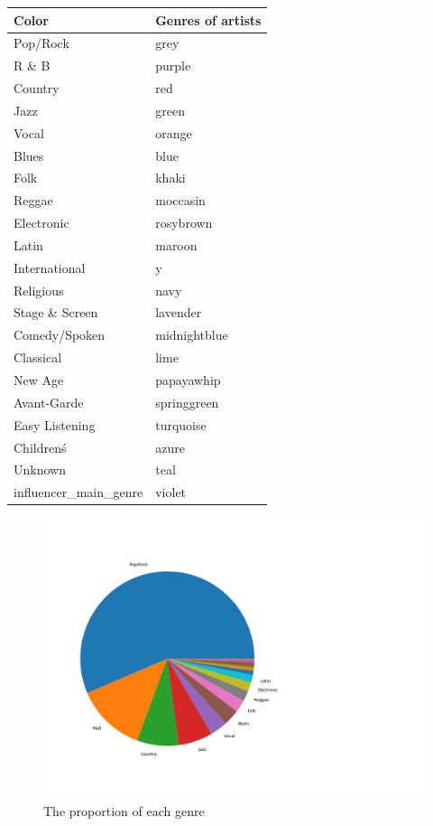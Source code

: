 \documentclass[12pt]{article}
\begin{document}
\begin{center}
\begin{tabular}{l|l}
Color & Genres of artists
\\ \hline
Pop/Rock  & grey       \\                     
R \& B  & purple\\
Country & red\\
Jazz & green\\
Vocal & orange\\
Blues & blue\\
Folk & khaki\\
Reggae & moccasin\\
Electronic & rosybrown\\
Latin & maroon\\
International & y\\
Religious & navy\\
Stage \& Screen & lavender\\
Comedy/Spoken & midnightblue\\
Classical & lime\\
New Age & papayawhip\\
Avant-Garde & springgreen\\
Easy Listening & turquoise\\
Children\' s & azure\\
Unknown & teal\\
influencer\_main\_genre & violet\\
\end{tabular}
\end{center}
\begin{figure}
\small
\centering
\includegraphics[width=24cm]{Figure_1.png}
\caption{The proportion of each genre}
\end{figure}


\end{document}
